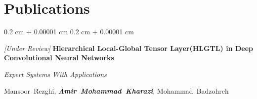 \documentclass[10pt, letterpaper]{article}
\newenvironment{onecolentry}{
    \begin{adjustwidth}{
        0.2 cm + 0.00001 cm
    }{
        0.2 cm + 0.00001 cm
    }
}{
    \end{adjustwidth}
} %
\newenvironment{twocolentry}[2][]{
    \onecolentry
    \def\secondColumn{#2}
    \setcolumnwidth{\fill, 4.5 cm}
    \begin{paracol}{2}
}{
    \switchcolumn \raggedleft \secondColumn
    \end{paracol}
    \endonecolentry
} %
\let\hrefWithoutArrow\href
\renewcommand{\href}[2]{\hrefWithoutArrow{#1}{\ifthenelse{\equal{#2}{}}{ }{#2 }\raisebox{.15ex}{\footnotesize \faExternalLink*}}}
\begin{document}
\vspace{1.5mm}





    \section{Publications}
    
    \begin{samepage}
    	\begin{twocolentry}{
    			2025
    		}
    		\textit{[Under Review]} \textbf{Hierarchical Local-Global Tensor Layer(HLGTL) in Deep Convolutional Neural Networks}
    		
    		\textit{Expert Systems With Applications}    		
    		
    		\vspace{1mm}
    		 \mbox{Mansoor Rezghi}, \mbox{\textbf{\textit{Amir Mohammad Kharazi}}}, \mbox{Mohammad Badzohreh}
    		
    		
    	\end{twocolentry}
    	
    	
    	\vspace{0.10 cm}
    	
    \end{samepage}
    
    
%    		
%    		
%    		
%    	
%    	
    	
   
\end{document}
